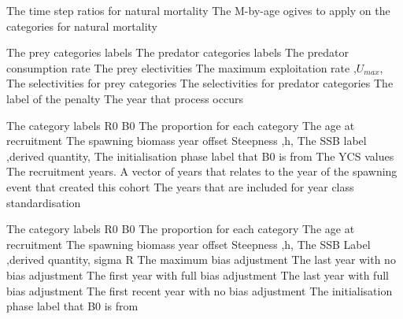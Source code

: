  {The time step ratios for natural mortality}
 {The M-by-age ogives to apply on the categories for natural mortality}
\par\textbf{}\par
{} {The prey categories labels}
 {The predator categories labels}
 {The predator consumption rate}
 {The prey electivities}
 {The maximum exploitation rate ,$U_{max}$,}
 {The selectivities for prey categories}
 {The selectivities for predator categories}
 {The label of the penalty}
 {The year that process occurs}
\par\textbf{}\par
{} {The category labels}
 {R0}
 {B0}
 {The proportion for each category}
 {The age at recruitment}
 {The spawning biomass year offset}
 {Steepness ,h,}
 {The SSB label ,derived quantity,}
 {The initialisation phase label that B0 is from}
 {The YCS values}
 {The recruitment years. A vector of years that relates to the year of the spawning event that created this cohort}
 {The years that are included for year class standardisation}
\par\textbf{}\par
{} {The category labels}
 {R0}
 {B0}
 {The proportion for each category}
 {The age at recruitment}
 {The spawning biomass year offset}
 {Steepness ,h,}
 {The SSB Label ,derived quantity,}
 {sigma R}
 {The maximum bias adjustment}
 {The last year with no bias adjustment}
 {The first year with full bias adjustment}
 {The last year with full bias adjustment}
 {The first recent year with no bias adjustment}
 {The initialisation phase label that B0 is from}
